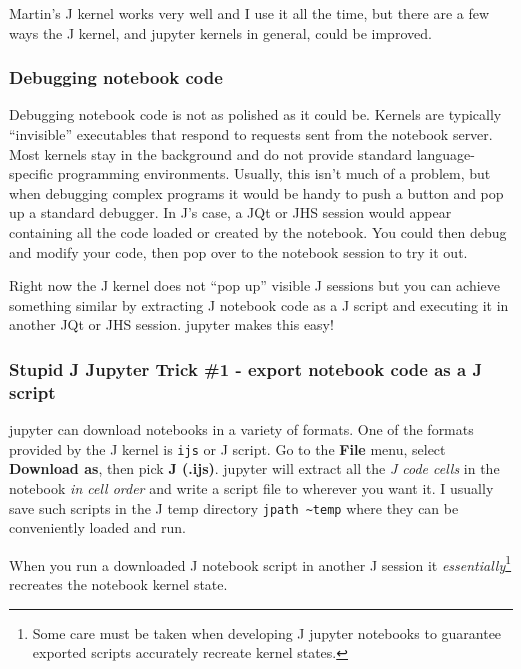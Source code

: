 Martin's J kernel works very well and I use it all the time, but there
are a few ways the J kernel, and jupyter kernels in general, could be
improved.

\subsubsection*{Debugging notebook code}%

Debugging notebook code is not as polished as it could be. Kernels are
typically ``invisible'' executables that respond to requests sent from
the notebook server. Most kernels stay in the background and do not
provide standard language-specific programming environments. Usually,
this isn't much of a problem, but when debugging complex programs it
would be handy to push a button and pop up a standard debugger. In J's
case, a JQt or JHS session would appear containing all the code loaded
or created by the notebook. You could then debug and modify your code,
then pop over to the notebook session to try it out.

Right now the J kernel does not ``pop up'' visible J sessions but you
can achieve something similar by extracting J notebook code as a J
script and executing it in another JQt or JHS session. jupyter makes
this easy!

\subsubsection*{Stupid J Jupyter Trick \#1 - export notebook code as a J
script}%

jupyter can download notebooks in a variety of formats. One of the
formats provided by the J kernel is \texttt{ijs} or J script. Go to the
\textbf{File} menu, select \textbf{Download as}, then pick \textbf{J
(.ijs)}. jupyter will extract all the \emph{J code cells} in the
notebook \emph{in cell order} and write a script file to wherever you
want it. I usually save such scripts in the J temp directory \texttt{jpath
\textasciitilde temp} where they can be conveniently loaded and run.

When you run a downloaded J notebook script in another J session it
\emph{essentially}\footnote{Some care must be taken when developing J jupyter notebooks to
guarantee exported scripts accurately recreate kernel states.} recreates the notebook kernel state.

